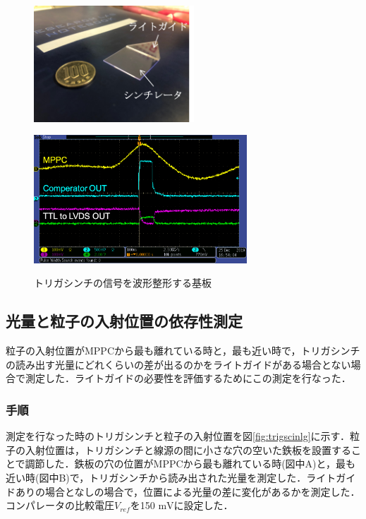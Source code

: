 \begin{figure}[h]
  \centering
  \begin{minipage}[b]{0.45\linewidth}
    \centering
    \includegraphics[width=6cm]{./figure/trigscin.png}
    \label{fig:pcb}
  \end{minipage}
  \begin{minipage}[b]{0.45\linewidth}
    \centering
    \includegraphics[width=8cm]{./figure/pcbosiro.png}
    \label{fig:extosiro}
  \end{minipage}
  \caption{トリガシンチの信号を波形整形する基板}
\end{figure}

\subsection{光量と粒子の入射位置の依存性測定}
粒子の入射位置がMPPCから最も離れている時と，最も近い時で，トリガシンチの読み出す光量にどれくらいの差が出るのかをライトガイドがある場合とない場合で測定した．ライトガイドの必要性を評価するためにこの測定を行なった．

\subsubsection*{手順}
測定を行なった時のトリガシンチと粒子の入射位置を図\ref{fig:trigscinlg}に示す．粒子の入射位置は，トリガシンチと線源の間に小さな穴の空いた鉄板を設置することで調節した．鉄板の穴の位置がMPPCから最も離れている時(図中A)と，最も近い時(図中B)で，トリガシンチから読み出された光量を測定した．ライトガイドありの場合となしの場合で，位置による光量の差に変化があるかを測定した．コンパレータの比較電圧$V_{ref}$を150 $\mathrm{mV}$に設定した．

